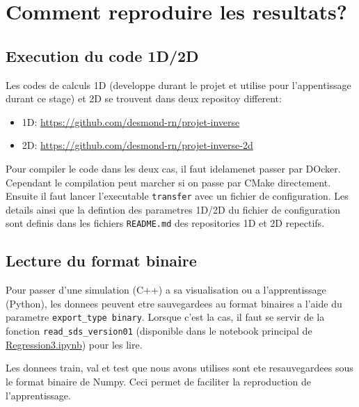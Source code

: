 

\chapter{Comment reproduire les resultats?} %

\label{AppendixA} %

\section{Execution du code 1D/2D}

Les codes de calculs 1D (developpe durant le projet et utilise pour l'appentissage durant ce stage) et 2D se trouvent dans deux repositoy different:
\begin{itemize}
 \item 1D: \url{https://github.com/desmond-rn/projet-inverse} 
 \item 2D: \url{https://github.com/desmond-rn/projet-inverse-2d}
\end{itemize}


Pour compiler le code dans les deux cas, il faut idelamenet passer par DOcker. Cependant le compilation peut marcher si on passe par CMake directement.
Ensuite il faut lancer l'executable \verb|transfer| avec un fichier de configuration. Les details ainsi que la defintion des parametres 1D/2D du fichier de configuration sont definis dans les fichiers \verb|README.md| des repositories 1D et 2D repectifs.

\section{Lecture du format binaire}
Pour passer d'une simulation (C++) a sa visualisation ou a l'apprentissage (Python), les donnees peuvent etre sauvegardees au format binaires a l'aide du parametre \verb|export_type binary|. Lorsque c'est la cas, il faut se servir de la fonction \verb|read_sds_version01| (disponible dans le notebook principal de \href{https://colab.research.google.com/drive/18oCXoZzY0_7XnEmHBzHH40vVVnIacoVc?usp=sharing}{Regression3.ipynb}) pour les lire.

Les donnees train, val et test que nous avons utilises sont ete resauvegardees sous le format binaire de Numpy. Ceci permet de faciliter la reproduction de l'apprentissage.


